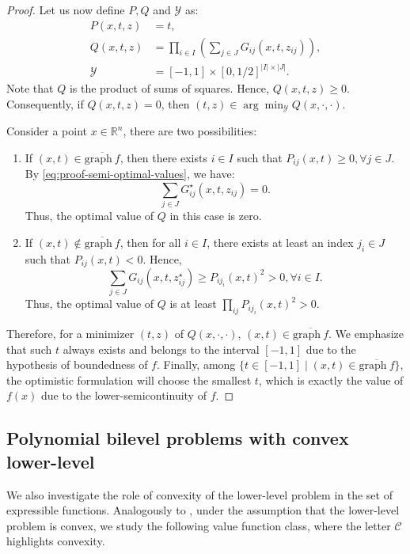 \documentclass{article}
\newcommand*{\cC}{\mathcal{C}}
\newcommand*{\cY}{\mathcal{Y}}
\newcommand*{\RR}{\mathbb{R}}
\newcommand{\graph}{\mathrm{graph}\ }
\newcommand{\argmin}{\arg\min}
\theoremstyle{plain}
\theoremstyle{definition}
\begin{document}
\begin{proof}
    Let us now define $P, Q$ and $\cY$ as:
    \begin{equation}
        \label{eq:construction-compact-lsc}
        \begin{aligned}
            P(x,t,z) &= t, \\
            Q(x,t,z) &= \prod_{i \in I}\left(\sum_{j \in J} G_{ij}(x,t,z_{ij})\right),\\
            \cY &= [-1, 1] \times [0, 1/2]^{|I| \times |J|}.
        \end{aligned}
    \end{equation}
    Note that $Q$ is the product of sums of squares. Hence, $Q(x,t,z) \geq 0$. Consequently, if $Q(x,t,z) = 0$, then $(t,z) \in \argmin_{\cY} Q(x, \cdot,\cdot)$. 

    Consider a point $x \in \RR^n$, there are two possibilities:
    \begin{enumerate}[leftmargin=*]
        \item If $(x,t) \in \overline{\graph f}$, then there exists $i \in I$ such that $P_{ij}(x,t) \geq 0, \forall j \in J$. By \eqref{eq:proof-semi-optimal-values}, we have:
        \begin{equation*}
            \sum_{j \in J} G_{ij}^\star(x,t,z_{ij}) = 0.
        \end{equation*}
        Thus, the optimal value of $Q$ in this case is zero. 
        
        \item If $(x,t) \notin \overline{\graph f}$, then for all $i \in I$, there exists at least an index $j_i \in J$ such that $P_{ij}(x,t) < 0$. Hence, 
        \begin{equation*}
            \sum_{j \in J} G_{ij}(x,t,z_{ij}^\star) \geq P_{ij_i}(x,t)^2 > 0, \forall i \in I.
        \end{equation*}
        Thus, the optimal value of $Q$ is at least $\prod_{ij} P_{ij_i}(x,t)^2 > 0$. 
    \end{enumerate}
    Therefore, for a minimizer $(t,z)$ of $Q(x, \cdot,\cdot)$, $(x,t) \in \overline{\graph f}$. We emphasize that such $t$ always exists and belongs to the interval $[-1,1]$ due to the hypothesis of boundedness of $f$. Finally, among $\{t \in [-1,1] \mid (x,t) \in \overline{\graph f}\}$, the optimistic formulation will choose the smallest $t$, which is exactly the value of $f(x)$ due to the lower-semicontinuity of $f$. 
\end{proof}

\subsection{Polynomial bilevel problems with convex lower-level}
\label{subsection:compact-results}
We also investigate the role of convexity of the lower-level problem in the set of expressible functions. Analogously to , under the assumption that the lower-level problem is convex, we study the following value function class, where the letter $\cC$ highlights convexity.
\end{document}
